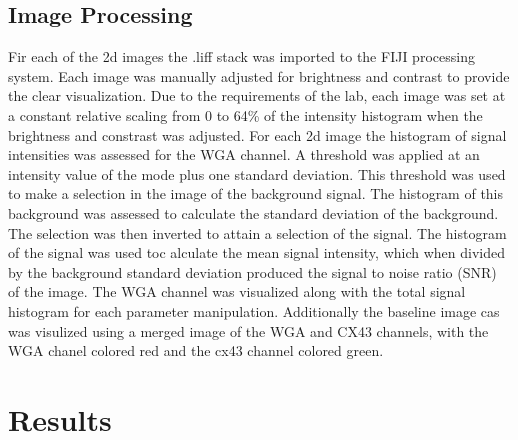\documentclass[12pt]{article}
\begin{document}
\subsection{Image Processing}
Fir each of the 2d images the .liff stack was imported to the FIJI processing system. Each image was manually adjusted for brightness and contrast to provide the clear visualization. Due to the requirements of the lab, each image was set at a constant relative scaling from 0 to 64\% of the intensity histogram when the brightness and constrast was adjusted. For each 2d image the histogram of signal intensities was assessed for the WGA channel. A threshold was applied at an intensity value of the mode plus one standard deviation. This threshold was used to make a selection in the image of the background signal. The histogram of this background was assessed to calculate the standard deviation of the background. The selection was then inverted to attain a selection of the signal. The histogram of the signal was used toc alculate the mean signal intensity, which when divided by the background standard deviation produced the signal to noise ratio (SNR) of the image. The WGA channel was visualized along with the total signal histogram for each parameter manipulation. Additionally the baseline image cas was visulized using a merged image of the WGA and CX43 channels, with the WGA chanel colored red and the cx43 channel colored green.


\section{Results}
\end{document}
